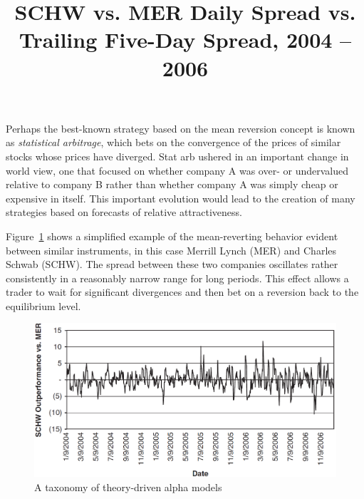 \documentclass[11pt]{report}
\begin{document}
					Perhaps the best-known strategy based on the mean reversion concept is known as \textit{statistical arbitrage}, which bets on the convergence of the prices of similar stocks whose prices have diverged. Stat arb ushered in an important change in world view, one that focused on whether company A was over- or undervalued relative to company B rather than whether company A was simply cheap or expensive in itself. This important evolution would lead to the creation of many strategies based on forecasts of relative attractiveness.

					Figure~\ref{fig:reversionspread} shows a simplified example of the mean-reverting behavior evident between similar instruments, in this case Merrill Lynch (MER) and Charles Schwab (SCHW). The spread between these two companies oscillates rather consistently in a reasonably narrow range for long periods. This effect allows a trader to wait for significant divergences and then bet on a reversion back to the equilibrium level.

					\begin{figure}[htbp]
						\centering
						\title{SCHW vs. MER Daily Spread vs. Trailing Five-Day Spread, 2004 -- 2006}
						\includegraphics[width=.9\textwidth]{reversionspread.png}
						\caption{A taxonomy of theory-driven alpha models}
						\label{fig:reversionspread}
					\end{figure}
\end{document}
